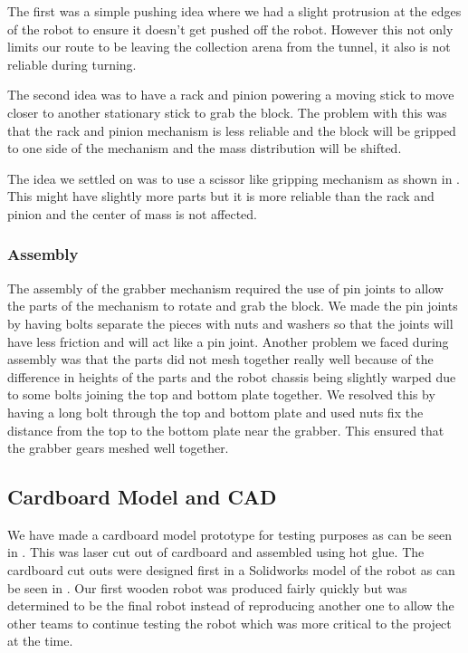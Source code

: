 \documentclass{article}
\begin{document}
\quad The first was a simple pushing idea where we had a slight protrusion at the edges of the robot to ensure it doesn't get pushed off the robot. However this not only limits our route to be leaving the collection arena from the tunnel, it also is not reliable during turning.

\quad The second idea was to have a rack and pinion powering a moving stick to move closer to another stationary stick to grab the block. The problem with this was that the rack and pinion mechanism is less reliable and the block will be gripped to one side of the mechanism and the mass distribution will be shifted.

\quad The idea we settled on was to use a scissor like gripping mechanism as shown in . This might have slightly more parts but it is more reliable than the rack and pinion and the center of mass is not affected.

\subsubsection{Assembly}

\quad The assembly of the grabber mechanism required the use of pin joints to allow the parts of the mechanism to rotate and grab the block. We made the pin joints by having bolts separate the pieces with nuts and washers so that the joints will have less friction and will act like a pin joint. Another problem we faced during assembly was that the parts did not mesh together really well because of the difference in heights of the parts and the robot chassis being slightly warped due to some bolts joining the top and bottom plate together. We resolved this by having a long bolt through the top and bottom plate and used nuts fix the distance from the top to the bottom plate near the grabber. This ensured that the grabber gears meshed well together.

\subsection{Cardboard Model and CAD}
\quad We have made a cardboard model prototype for testing purposes as can be seen in . This was laser cut out of cardboard and assembled using hot glue. The cardboard cut outs were designed first in a Solidworks model of the robot as can be seen in . Our first wooden robot was produced fairly quickly but was determined to be the final robot instead of reproducing another one to allow the other teams to continue testing the robot which was more critical to the project at the time.
\end{document}
